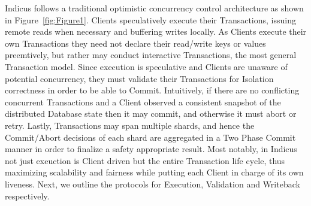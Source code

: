 Indicus follows a traditional optimistic concurrency control architecture as shown in Figure~\ref{fig:Figure1}. Clients speculatively execute their Transactions, issuing remote reads when necessary and buffering writes locally. As Clients execute their own Transactions they need not declare their read/write keys or values preemtively, but rather may conduct interactive Transactions, the most general Transaction model. Since execution is speculative and Clients are unaware of potential concurrency, they must validate their Transactions for Isolation correctness in order to be able to Commit. Intuitively, if there are no conflicting concurrent Transactions and a Client observed a consistent snapshot of the distributed Database state then it may commit, and otherwise it must abort or retry. Lastly, Transactions may span multiple shards, and hence the Commit/Abort decisions of each shard are aggregated in a Two Phase Commit manner in order to finalize a safety appropriate result. Most notably, in Indicus not just exeuction is Client driven but the entire Transaction life cycle, thus maximizing scalability and fairness while putting each Client in charge of its own liveness.
Next, we outline the protocols for Execution, Validation and Writeback respectively.

\fi